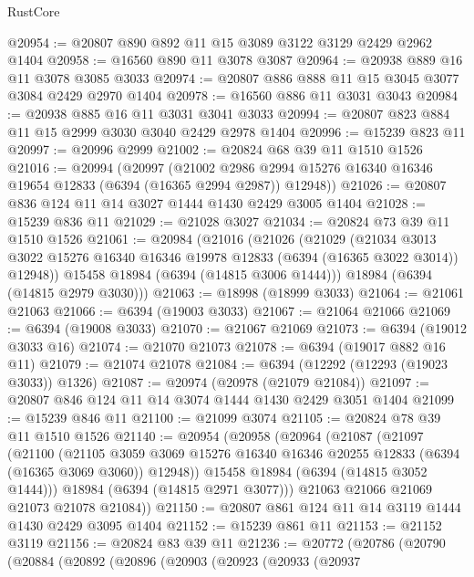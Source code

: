 \begin{lexlean}{RustCore}
\begin{coremodule}
@20954 := @20807 @890 @892 @11 @15 @3089 @3122 @3129 @2429 @2962 @1404
@20958 := @16560 @890 @11 @3078 @3087
@20964 := @20938 @889 @16 @11 @3078 @3085 @3033
@20974 := @20807 @886 @888 @11 @15 @3045 @3077 @3084 @2429 @2970 @1404
@20978 := @16560 @886 @11 @3031 @3043
@20984 := @20938 @885 @16 @11 @3031 @3041 @3033
@20994 := @20807 @823 @884 @11 @15 @2999 @3030 @3040 @2429 @2978 @1404
@20996 := @15239 @823 @11
@20997 := @20996 @2999
@21002 := @20824 @68 @39 @11 @1510 @1526
@21016 := @20994
    (@20997
      (@21002 @2986 @2994 @15276 @16340 @16346 @19654 @12833 (@6394 (@16365 @2994 @2987)) @12948))
@21026 := @20807 @836 @124 @11 @14 @3027 @1444 @1430 @2429 @3005 @1404
@21028 := @15239 @836 @11
@21029 := @21028 @3027
@21034 := @20824 @73 @39 @11 @1510 @1526
@21061 := @20984
    (@21016
      (@21026
        (@21029
          (@21034
            @3013
            @3022
            @15276
            @16340
            @16346
            @19978
            @12833
            (@6394 (@16365 @3022 @3014))
            @12948))
        @15458
        @18984
        (@6394 (@14815 @3006 @1444)))
      @18984
      (@6394 (@14815 @2979 @3030)))
@21063 := @18998 (@18999 @3033)
@21064 := @21061 @21063
@21066 := @6394 (@19003 @3033)
@21067 := @21064 @21066
@21069 := @6394 (@19008 @3033)
@21070 := @21067 @21069
@21073 := @6394 (@19012 @3033 @16)
@21074 := @21070 @21073
@21078 := @6394 (@19017 @882 @16 @11)
@21079 := @21074 @21078
@21084 := @6394 (@12292 (@12293 (@19023 @3033)) @1326)
@21087 := @20974 (@20978 (@21079 @21084))
@21097 := @20807 @846 @124 @11 @14 @3074 @1444 @1430 @2429 @3051 @1404
@21099 := @15239 @846 @11
@21100 := @21099 @3074
@21105 := @20824 @78 @39 @11 @1510 @1526
@21140 := @20954
    (@20958
      (@20964
        (@21087
          (@21097
            (@21100
              (@21105
                @3059
                @3069
                @15276
                @16340
                @16346
                @20255
                @12833
                (@6394 (@16365 @3069 @3060))
                @12948))
            @15458
            @18984
            (@6394 (@14815 @3052 @1444)))
          @18984
          (@6394 (@14815 @2971 @3077)))
        @21063
        @21066
        @21069
        @21073
        @21078
        @21084))
@21150 := @20807 @861 @124 @11 @14 @3119 @1444 @1430 @2429 @3095 @1404
@21152 := @15239 @861 @11
@21153 := @21152 @3119
@21156 := @20824 @83 @39 @11
@21236 := @20772
    (@20786
      (@20790
        (@20884
          (@20892
            (@20896
              (@20903
                (@20923
                  (@20933
                    (@20937

\end{coremodule}
\end{lexlean}
